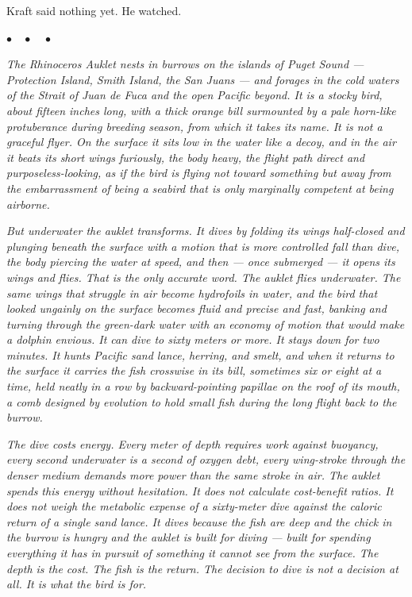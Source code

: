 \documentclass[12pt, letterpaper]{article}
\begin{document}
Kraft said nothing yet. He watched.

\begin{center}
$\bullet\quad\bullet\quad\bullet$
\end{center}

\emph{The Rhinoceros Auklet nests in burrows on the islands of Puget Sound --- Protection Island, Smith Island, the San Juans --- and forages in the cold waters of the Strait of Juan de Fuca and the open Pacific beyond. It is a stocky bird, about fifteen inches long, with a thick orange bill surmounted by a pale horn-like protuberance during breeding season, from which it takes its name. It is not a graceful flyer. On the surface it sits low in the water like a decoy, and in the air it beats its short wings furiously, the body heavy, the flight path direct and purposeless-looking, as if the bird is flying not toward something but away from the embarrassment of being a seabird that is only marginally competent at being airborne.}

\emph{But underwater the auklet transforms. It dives by folding its wings half-closed and plunging beneath the surface with a motion that is more controlled fall than dive, the body piercing the water at speed, and then --- once submerged --- it opens its wings and flies. That is the only accurate word. The auklet flies underwater. The same wings that struggle in air become hydrofoils in water, and the bird that looked ungainly on the surface becomes fluid and precise and fast, banking and turning through the green-dark water with an economy of motion that would make a dolphin envious. It can dive to sixty meters or more. It stays down for two minutes. It hunts Pacific sand lance, herring, and smelt, and when it returns to the surface it carries the fish crosswise in its bill, sometimes six or eight at a time, held neatly in a row by backward-pointing papillae on the roof of its mouth, a comb designed by evolution to hold small fish during the long flight back to the burrow.}

\emph{The dive costs energy. Every meter of depth requires work against buoyancy, every second underwater is a second of oxygen debt, every wing-stroke through the denser medium demands more power than the same stroke in air. The auklet spends this energy without hesitation. It does not calculate cost-benefit ratios. It does not weigh the metabolic expense of a sixty-meter dive against the caloric return of a single sand lance. It dives because the fish are deep and the chick in the burrow is hungry and the auklet is built for diving --- built for spending everything it has in pursuit of something it cannot see from the surface. The depth is the cost. The fish is the return. The decision to dive is not a decision at all. It is what the bird is for.}
\end{document}
